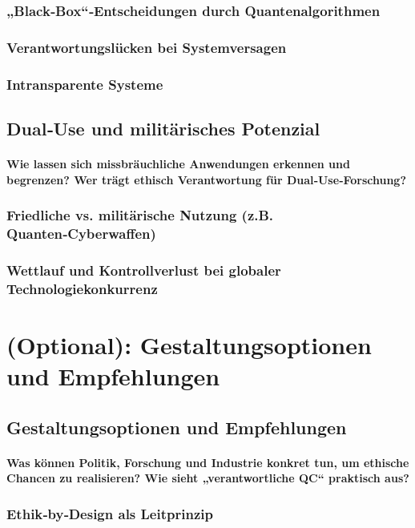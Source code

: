 \subsubsection{ „Black‑Box“‑Entscheidungen durch Quantenalgorithmen}
\subsubsection{Verantwortungslücken bei Systemversagen}
\subsubsection{Intransparente Systeme}

\subsection{Dual‑Use und militärisches Potenzial}
\paragraph{Wie lassen sich missbräuchliche Anwendungen erkennen und begrenzen? 
Wer trägt ethisch Verantwortung für Dual‑Use‑Forschung?}

\subsubsection{Friedliche vs. militärische Nutzung (z.B. Quanten‑Cyberwaffen)}
\subsubsection{Wettlauf und Kontrollverlust bei globaler Technologiekonkurrenz}

\section{(Optional): Gestaltungsoptionen und Empfehlungen}

\subsection{Gestaltungsoptionen und Empfehlungen}
\paragraph{Was können Politik, Forschung und Industrie konkret tun, um ethische Chancen zu realisieren? 
Wie sieht „verantwortliche QC“ praktisch aus?}

\subsubsection{Ethik‑by‑Design als Leitprinzip}

